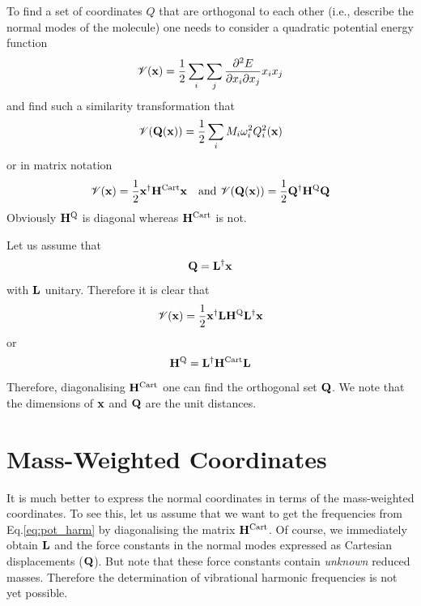 \documentclass[a4paper,titlepage,twoside,fleqn,12pt]{book}
\begin{document}
\begin{appendices}
To find a set of coordinates $Q$ that are orthogonal to each other (i.e., describe the normal 
modes of the molecule) one needs to consider a quadratic potential energy function
\begin{equation}
\mathscr{V}({\bf x}) = \frac{1}{2} \sum_i\sum_j \frac{\partial^2 E}{\partial x_i \partial x_j} x_i x_j
\end{equation}
and find such a similarity transformation that
\begin{equation}\label{eq:pot_harm}
\mathscr{V}({\bf Q}({\bf x})) = \frac{1}{2} \sum_i M_i \omega_i^2 Q_i^2({\bf x})
\end{equation}
or in matrix notation
\begin{equation}
\mathscr{V}({\bf x}) = \frac{1}{2} {\bf x}^{\dagger} {\bf H}^{\rm Cart} {\bf x}  
\quad \textrm{and   } \mathscr{V}({\bf Q}({\bf x})) = \frac{1}{2} {\bf Q}^{\dagger} {\bf H}^{\rm Q} {\bf Q} 
\end{equation}
Obviously ${\bf H}^{\rm Q}$ is diagonal whereas ${\bf H}^{\rm Cart}$ is not. 

Let us assume that
\begin{equation}
{\bf Q} = {\bf L}^{\dagger} {\bf x}
\end{equation}
with ${\bf L}$ unitary.
Therefore it is clear that
\begin{equation}
\mathscr{V}({\bf x}) = \frac{1}{2} {\bf x}^{\dagger} {\bf L} {\bf H}^{\rm Q} {\bf L}^{\dagger} {\bf x}
\end{equation}
or
\begin{equation}
{\bf H}^{\rm Q} = {\bf L}^{\dagger} {\bf H}^{\rm Cart} {\bf L}
\end{equation}
Therefore, diagonalising ${\bf H}^{\rm Cart}$ one can find the orthogonal 
set ${\bf Q}$. We note that the dimensions of ${\bf x}$ and ${\bf Q}$ are the unit distances.

\section{Mass-Weighted Coordinates\label{a:mw-coord}}

It is much better to express the normal coordinates in terms of the mass\hyp{}weighted coordinates.
To see this, let us assume that we want to get the frequencies from Eq.\eqref{eq:pot_harm} by diagonalising
the matrix ${\bf H}^{\rm Cart}$. Of course, we immediately obtain ${\bf L}$ and the force constants
in the normal modes expressed as Cartesian displacements (${\bf Q}$). But note that these force constants 
contain \emph{unknown} reduced masses.
Therefore the determination of vibrational harmonic frequencies is not yet possible. 


\end{appendices}
\end{document}
